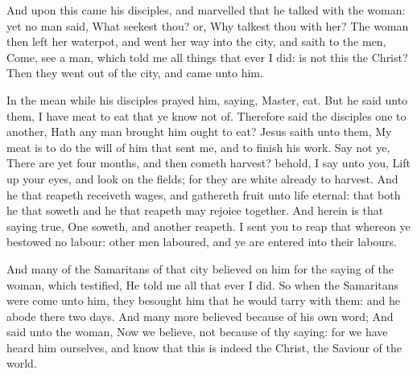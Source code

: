  And upon this came his disciples, and marvelled that he
talked with the woman: yet no man said, What seekest thou? or, Why
talkest thou with her?  The woman then left her waterpot,
and went her way into the city, and saith to the men, 
Come, see a man, which told me all things that ever I did: is not this
the Christ?  Then they went out of the city, and came unto
him.

 In the mean while his disciples prayed him, saying,
Master, eat.  But he said unto them, I have meat to eat
that ye know not of.  Therefore said the disciples one to
another, Hath any man brought him ought to eat?  Jesus
saith unto them, My meat is to do the will of him that sent me, and to
finish his work.  Say not ye, There are yet four months,
and then cometh harvest? behold, I say unto you, Lift up your eyes, and
look on the fields; for they are white already to harvest. 
And he that reapeth receiveth wages, and gathereth fruit unto life
eternal: that both he that soweth and he that reapeth may rejoice
together.  And herein is that saying true, One soweth, and
another reapeth.  I sent you to reap that whereon ye
bestowed no labour: other men laboured, and ye are entered into their
labours.

 And many of the Samaritans of that city believed on him
for the saying of the woman, which testified, He told me all that ever I
did.  So when the Samaritans were come unto him, they
besought him that he would tarry with them: and he abode there two days.
 And many more believed because of his own word;
 And said unto the woman, Now we believe, not because of
thy saying: for we have heard him ourselves, and know that this is
indeed the Christ, the Saviour of the world.

